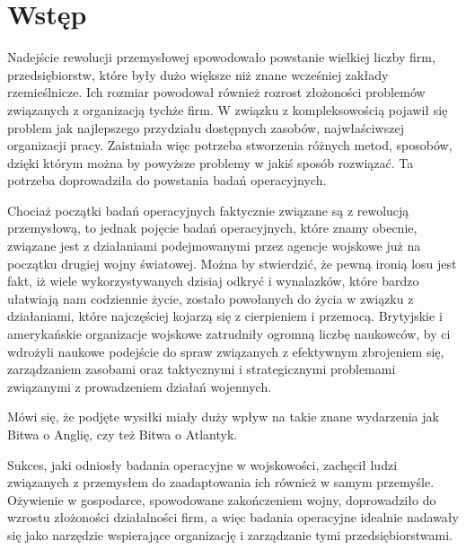\chapter{Wstęp}
\label{cha:wstep}
Nadejście rewolucji przemysłowej spowodowało powstanie wielkiej liczby firm, przedsiębiorstw, które były dużo większe niż znane wcześniej zakłady rzemieślnicze. Ich rozmiar powodował również rozrost złożoności problemów związanych z organizacją tychże firm. W związku z kompleksowością pojawił się problem jak najlepszego przydziału dostępnych zasobów, najwłaściwszej organizacji pracy. Zaistniała więc potrzeba stworzenia różnych metod, sposobów, dzięki którym można by powyższe problemy w jakiś sposób rozwiązać. Ta potrzeba doprowadziła do powstania badań operacyjnych.

Chociaż początki badań operacyjnych faktycznie związane są z rewolucją przemysłową, to jednak pojęcie badań operacyjnych, które znamy obecnie, związane jest z działaniami podejmowanymi przez agencje wojskowe już na początku drugiej wojny światowej. Można by stwierdzić, że pewną ironią losu jest fakt, iż wiele wykorzystywanych dzisiaj odkryć i wynalazków, które bardzo ułatwiają nam  codziennie życie, zostało powołanych do życia w związku z działaniami, które najczęściej kojarzą się z cierpieniem i przemocą. 
Brytyjskie i amerykańskie organizacje wojskowe zatrudniły ogromną liczbę naukowców, by ci wdrożyli naukowe podejście do spraw związanych z efektywnym zbrojeniem się, zarządzaniem zasobami oraz taktycznymi i strategicznymi problemami związanymi z prowadzeniem działań wojennych.

Mówi się, że podjęte wysiłki miały duży wpływ na takie znane wydarzenia jak Bitwa o Anglię, czy też Bitwa o Atlantyk.

Sukces, jaki odniosły badania operacyjne w wojskowości, zachęcił ludzi związanych z przemysłem do zaadaptowania ich również w samym przemyśle. Ożywienie w gospodarce, spowodowane zakończeniem wojny, doprowadziło do wzrostu złożoności działalności firm, a więc badania operacyjne idealnie nadawały się jako narzędzie wspierające organizację i zarządzanie tymi przedsiębiorstwami. 

